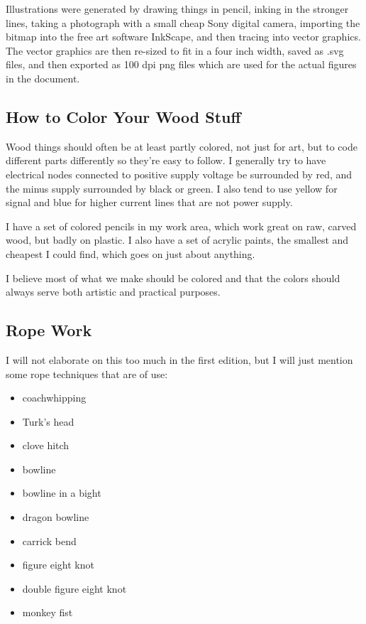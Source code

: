 Illustrations were generated by drawing things in pencil, inking in the
stronger lines, taking a photograph with a small cheap Sony digital
camera, importing the bitmap into the free art software InkScape, and
then tracing into vector graphics. The vector graphics are then re-sized
to fit in a four inch width, saved as .svg files, and then exported as
100 dpi png files which are used for the actual figures in the document.

\subsection{How to Color Your Wood
Stuff}\label{how-to-color-your-wood-stuff}

Wood things should often be at least partly colored, not just for art,
but to code different parts differently so they're easy to follow. I
generally try to have electrical nodes connected to positive supply
voltage be surrounded by red, and the minus supply surrounded by black
or green. I also tend to use yellow for signal and blue for higher
current lines that are not power supply.

I have a set of colored pencils in my work area, which work great on
raw, carved wood, but badly on plastic. I also have a set of acrylic
paints, the smallest and cheapest I could find, which goes on just about
anything.

I believe most of what we make should be colored and that the colors
should always serve both artistic and practical purposes.

\subsection{Rope Work}\label{rope-work}

I will not elaborate on this too much in the first edition, but I will
just mention some rope techniques that are of use:

\begin{itemize}
\tightlist
\item
  coachwhipping
\item
  Turk's head
\item
  clove hitch
\item
  bowline
\item
  bowline in a bight
\item
  dragon bowline
\item
  carrick bend
\item
  figure eight knot
\item
  double figure eight knot
\item
  monkey fist
\end{itemize}

